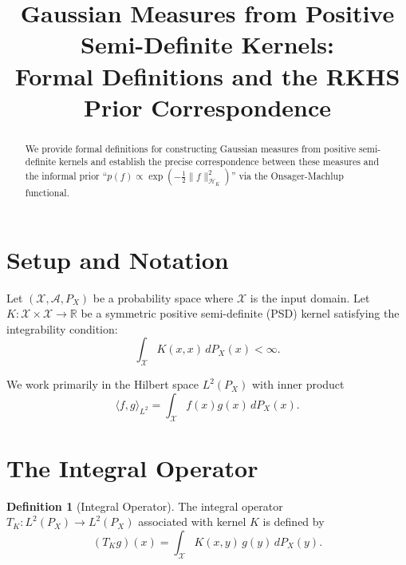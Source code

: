\documentclass[11pt]{article}
\title{Gaussian Measures from Positive Semi-Definite Kernels:\\
Formal Definitions and the RKHS Prior Correspondence}
\author{}
\date{}
\theoremstyle{definition}
\newtheorem{definition}[theorem]{Definition}
\newcommand{\HK}{\mathcal{H}_K}
\newcommand{\X}{\mathcal{X}}
\newcommand{\R}{\mathbb{R}}
\newcommand{\inprod}[2]{\langle #1, #2 \rangle}
\begin{document}
\maketitle

\begin{abstract}
We provide formal definitions for constructing Gaussian measures from positive semi-definite kernels and establish the precise correspondence between these measures and the informal prior ``$p(f) \propto \exp(-\frac{1}{2}\|f\|_{\HK}^2)$'' via the Onsager-Machlup functional.
\end{abstract}

\tableofcontents

\section{Setup and Notation}

Let $(\X, \mathcal{A}, P_X)$ be a probability space where $\X$ is the input domain. Let $K: \X \times \X \to \R$ be a symmetric positive semi-definite (PSD) kernel satisfying the integrability condition:
\begin{equation}
    \int_{\X} K(x, x) \, dP_X(x) < \infty.
\end{equation}

We work primarily in the Hilbert space $L^2(P_X)$ with inner product
\begin{equation}
    \inprod{f}{g}_{L^2} = \int_{\X} f(x) g(x) \, dP_X(x).
\end{equation}

\section{The Integral Operator}

\begin{definition}[Integral Operator]
The integral operator $T_K: L^2(P_X) \to L^2(P_X)$ associated with kernel $K$ is defined by
\begin{equation}
    (T_K g)(x) = \int_{\X} K(x, y) \, g(y) \, dP_X(y).
\end{equation}
\end{definition}
\end{document}
